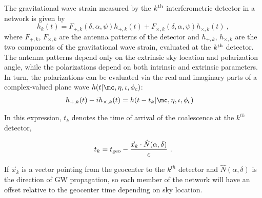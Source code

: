 The gravitational wave strain measured by the $k^{\rm th}$ interferometric detector in a network is given by
\begin{equation} \label{eq:measured_strain}
h_k(t) = F_{+,k}(\delta, \alpha, \psi) h_{+,k}(t) 
+ F_{\times,k}(\delta, \alpha, \psi) h_{\times,k}(t)\ ,
\end{equation}
where $F_{+,k}$, $F_{\times,k}$ are the antenna patterns of the detector and $h_{+,k}$, $h_{\times,k}$
are the two components of the gravitational wave strain, evaluated at the $k^{\rm th}$ detector. The antenna patterns depend only on the extrinsic sky location and polarization
angle, while the polarizations depend on both intrinsic and extrinsic parameters.   In turn, the polarizations can be
evaluated via the real and imaginary parts of a complex-valued plane wave $h(t|\mc,\eta,\iota,\phi_c)$:
\begin{align}
h_{+,k}(t)-i h_{\times, k}(t) &= h(t-t_k|\mc,\eta,\iota,\phi_c)
\end{align}

In this expression, $t_k$  denotes the time of arrival of the coalescence  at the $k^{th}$ detector,

\begin{equation} \label{eq:t_k}
t_k = t_{\rm geo} - \frac{\vec{x}_k \cdot \hat{N}(\alpha,\delta)}{c}\ .
\end{equation}

If $\vec{x}_k$ is a vector pointing from the geocenter to the $k^{th}$ detector and $\hat{N}(\alpha,\delta)$ is the direction of GW propagation, so each member of the network will have an offset relative to the geocenter time depending on sky location. 

